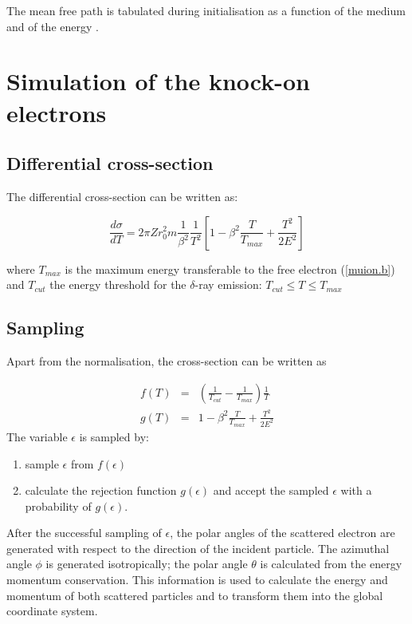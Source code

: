 The mean free path is tabulated during initialisation
as a function of the medium and of the energy . 

\section{Simulation of the knock-on electrons}
\subsection{Differential cross-section}
 The differential cross-section
can be written as:

\begin{equation}
\label{muion.i}
\frac{d \sigma} {dT}= 2 \pi Z r^2_0 m \frac{1}{\beta^2 } \frac{1}{T^2}
\left[1- \beta^ 2 \frac{T}{T_{max} }+ \frac{T^2} {2E^2} \right]
\end{equation}

where $T_{max}$  is the maximum energy transferable to the free electron 
(\ref{muion.b})
and $T_{cut}$  the energy threshold for the $\delta$-ray emission:
$ T_{cut} \leq T \leq  T_{max} $

\subsection{Sampling}
Apart from the normalisation, the cross-section can be written as

\begin{eqnarray*}
f(T) &=& \left(\frac{1}{T_{cut}} -\frac{1}{T_{max}}\right)
\frac{1}{T} \\
g(T) &=& 1 - \beta^2\frac{T}{T_{max}} +\frac{T^2}{2E^2}
\end{eqnarray*}
The variable $\epsilon$ is sampled by:
\begin{enumerate}
\item sample $\epsilon$ from $f(\epsilon)$
\item calculate the rejection function $g(\epsilon)$ and accept the
sampled $\epsilon$ with a probability of $g(\epsilon)$.
\end{enumerate}

After the successful sampling of $\epsilon$,  the polar
angles of the scattered electron are generated 
with respect to the direction of the
incident particle. The azimuthal angle $\phi$ is generated isotropically;
the polar angle
$\theta$ is calculated from the energy momentum conservation.
This information
is used to calculate the energy and momentum of both scattered
particles and to transform them into the global coordinate system.

